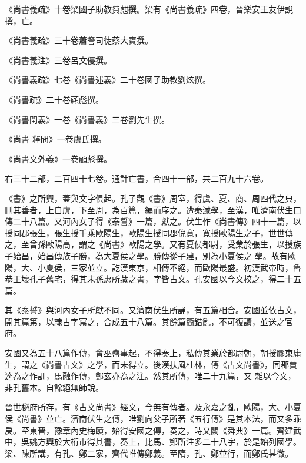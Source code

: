 \begin{pinyinscope}
 《尚書義疏》十卷梁國子助教費甝撰。梁有《尚書義疏》四卷，晉樂安王友伊說撰，亡。



 《尚書義疏》三十卷蕭詧司徒蔡大寶撰。



 《尚書義注》三卷呂文優撰。



 《尚書義疏》七卷《尚書述義》二十卷國子助教劉炫撰。



 《尚書疏》二十卷顧彪撰。



 《尚書閏義》一卷《尚書義》三卷劉先生撰。



 《尚書
 釋問》一卷虞氏撰。



 《尚書文外義》一卷顧彪撰。



 右三十二部，二百四十七卷。通計亡書，合四十一部，共二百九十六卷。



 《書》之所興，蓋與文字俱起。孔子觀《書》周室，得虞、夏、商、周四代之典，刪其善者，上自虞，下至周，為百篇，編而序之。遭秦滅學，至漢，唯濟南伏生口傳二十八篇。又河內女子得《泰誓》一篇，獻之。伏生作《尚書傳》四十一篇，以授同郡張生，張生授千乘歐陽生，歐陽生授同郡倪寬，寬授歐陽生之子，世世傳之，至曾孫歐陽高，謂之《尚書》歐陽之學。又有夏侯都尉，受業於張生，以授族子始昌，始昌傳族子勝，為大夏侯之學。勝傳從子建，別為小夏侯之
 學。故有歐陽，大、小夏侯，三家並立。訖漢東京，相傳不絕，而歐陽最盛。初漢武帝時，魯恭王壞孔子舊宅，得其末孫惠所藏之書，字皆古文。孔安國以今文校之，得二十五篇。



 其《泰誓》與河內女子所獻不同。又濟南伏生所誦，有五篇相合。安國並依古文，開其篇第，以隸古字寫之，合成五十八篇。其餘篇簡錯亂，不可復讀，並送之官府。



 安國又為五十八篇作傳，會巫蠱事起，不得奏上，私傳其業於都尉朝，朝授膠東庸生，謂之《尚書古文》之學，而未得立。後漢扶風杜林，傳《古文尚書》，同郡賈逵為之作訓，馬融作傳，鄭玄亦為之注。然其所傳，唯二十九篇，又
 雜以今文，非孔舊本。自餘絕無師說。



 晉世秘府所存，有《古文尚書》經文，今無有傳者。及永嘉之亂，歐陽，大、小夏侯《尚書》並亡。濟南伏生之傳，唯劉向父子所著《五行傳》是其本法，而又多乖戾。至東晉，豫章內史梅賾，始得安國之傳，奏之，時又闕《舜典》一篇。齊建武中，吳姚方興於大桁市得其書，奏上，比馬、鄭所注多二十八字，於是始列國學。梁、陳所講，有孔、鄭二家，齊代唯傳鄭義。至隋，孔、鄭並行，而鄭氏甚微。




\end{pinyinscope}
